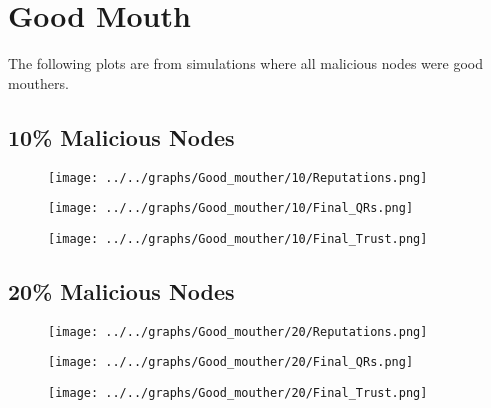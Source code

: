 \section*{Good Mouth}
The following plots are from simulations where all malicious nodes were
good mouthers.
\\
\begin{minipage}[t]{0.49\columnwidth}
\subsection*{10\% Malicious Nodes}
    \begin{figure}[H]
        \centering
        \texttt{[image: ../../graphs/Good\_mouther/10/Reputations.png]}
    \end{figure}
    \begin{figure}[H]
        \centering
        \texttt{[image: ../../graphs/Good\_mouther/10/Final\_QRs.png]}
    \end{figure}
\end{minipage}
\begin{minipage}[t]{0.49\columnwidth}
    \begin{figure}[H]
        \centering
        \texttt{[image: ../../graphs/Good\_mouther/10/Final\_Trust.png]}
    \end{figure}
\end{minipage}

\begin{minipage}[t]{0.49\columnwidth}
\subsection*{20\% Malicious Nodes}
    \begin{figure}[H]
        \centering
        \texttt{[image: ../../graphs/Good\_mouther/20/Reputations.png]}
    \end{figure}
    \begin{figure}[H]
        \centering
        \texttt{[image: ../../graphs/Good\_mouther/20/Final\_QRs.png]}
    \end{figure}
\end{minipage}
\begin{minipage}[t]{0.49\columnwidth}
    \begin{figure}[H]
        \centering
        \texttt{[image: ../../graphs/Good\_mouther/20/Final\_Trust.png]}
    \end{figure}
\end{minipage}


